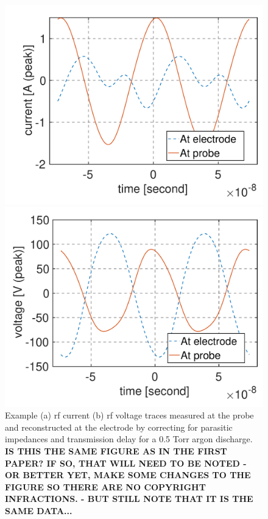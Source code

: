 \documentclass[12pt]{iopart}
\begin{document}
\begin{figure}[ht!]
\begin{center}
\begin{minipage}{0.495\textwidth}
    \includegraphics[width=1\textwidth]{electrode_vs_probe_current.pdf}
\end{minipage}
\begin{minipage}{0.495\textwidth}
    \includegraphics[width=1\textwidth]{electrode_vs_probe_voltage.pdf}
\end{minipage}
	\caption{Example (a) rf current (b) rf voltage traces measured at the probe and reconstructed at the electrode by correcting for parasitic impedances and transmission delay for a 0.5 Torr argon discharge. \textbf{IS THIS THE SAME FIGURE AS IN THE FIRST PAPER?  IF SO, THAT WILL NEED TO BE NOTED - OR BETTER YET, MAKE SOME CHANGES TO THE FIGURE SO THERE ARE NO COPYRIGHT INFRACTIONS.  - BUT STILL NOTE THAT IT IS THE SAME DATA...}}
	\label{Fig:Current_v_time}
\end{center}
\end{figure}
\end{document}
